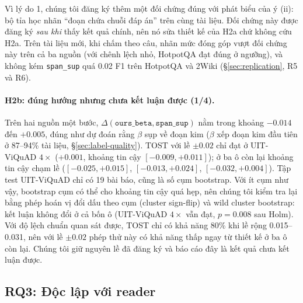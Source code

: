 \documentclass[11pt]{article}
\newcommand{\arm}[1]{\texttt{#1}}
\begin{document}
Vì lý do 1, chúng tôi đăng ký thêm một đối chứng đúng với phát biểu của ý (ii): bộ tỉa học nhãn ``đoạn chứa chuỗi
đáp án'' trên cùng tài liệu. Đối chứng này được đăng ký \emph{sau khi} thấy kết quả chính, nên nó sửa thiết kế của
H2a chứ không cứu H2a. Trên tài liệu mới, khi chấm theo câu, nhãn mức đóng góp vượt đối chứng này trên cả ba nguồn
(với chênh lệch nhỏ, HotpotQA đạt đúng ở ngưỡng), và không kém \arm{span\_sup} quá 0.02 F1 trên HotpotQA và 2Wiki
(\S\ref{sec:replication}, R5 và R6).

\paragraph{H2b: đúng hướng nhưng chưa kết luận được (1/4).} Trên hai nguồn một bước,
$\Delta(\arm{ours\_beta},\arm{span\_sup})$ nằm trong khoảng $-0.014$ đến $+0.005$, đúng như dự đoán rằng
$\beta$ sụp về đoạn kim ($\beta$ xếp đoạn kim đầu tiên ở 87--94\% tài liệu, \S\ref{sec:label-quality}). TOST
với lề $\pm0.02$ chỉ đạt ở UIT-ViQuAD $4\times$ ($+0.001$, khoảng tin cậy $[-0.009, +0.011]$); ở ba ô còn lại
khoảng tin cậy chạm lề ($[-0.025, +0.015]$, $[-0.013, +0.024]$, $[-0.032, +0.004]$). Tập test UIT-ViQuAD chỉ có
19 bài báo, cũng là số cụm bootstrap. Với ít cụm như vậy, bootstrap cụm có thể cho khoảng tin cậy quá hẹp, nên chúng tôi
kiểm tra lại bằng phép hoán vị đổi dấu theo cụm (cluster sign-flip) và wild cluster bootstrap: kết luận không đổi ở cả bốn ô
(UIT-ViQuAD $4\times$ vẫn đạt, $p=0.008$ sau Holm). Với độ lệch chuẩn quan sát được, TOST chỉ có khả năng 80\% khi lề rộng
0.015--0.031, nên với lề $\pm0.02$ phép thử này có khả năng thấp ngay từ thiết kế ở ba ô còn lại. Chúng tôi giữ nguyên lề đã đăng ký và báo cáo đây là kết
quả chưa kết luận được.

\subsection{RQ3: Độc lập với reader}
\end{document}
